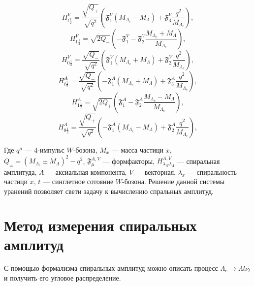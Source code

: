 \documentclass[a0,portrait]{a0poster}
\newcommand{\inrad}[1]{\left( #1 \right)}
\newcommand{\inner}[1]{\left( #1 \right)}
\newcommand\tab[1][0.51cm]{\hspace*{#1}}
\begin{document}
\begin{mdframed}[style=MyFrame]
\begin{multicols}{2}
\begin{multicols}{2}
    \begin{equation*}
    H^{V}_{t\frac{1}{2}} = \frac{\sqrt{Q_+}}{\sqrt{q^2}} \inrad{ \mathfrak F_1^V \inrad{ M_{\Lambda_c} - M_{\Lambda} } + \mathfrak F_3^V \frac{q^2}{M_{\Lambda_c}} },
    \end{equation*}
    \begin{equation*}
    H^{V}_{1\frac{1}{2}} = \sqrt{2Q_-} \inrad{ - \mathfrak F_1^V - \mathfrak F_2^V \frac{M_{\Lambda_c} + M_{\Lambda}}{M_{\Lambda_c}} },
    \end{equation*}
    \begin{equation*}
    H^{V}_{0\frac{1}{2}} = \frac{\sqrt{Q_-}}{\sqrt{q^2}} \inrad{ \mathfrak F_1^V \inrad{ M_{\Lambda_c} + M_{\Lambda} } + \mathfrak F_2^V \frac{q^2}{M_{\Lambda_c}} },
    \end{equation*}
    \begin{equation*}
    H^{A}_{t\frac{1}{2}} = \frac{\sqrt{Q_-}}{\sqrt{q^2}} \inrad{ - \mathfrak F_1^A \inrad{ M_{\Lambda_c} + M_{\Lambda} } + \mathfrak F_3^A \frac{q^2}{M_{\Lambda_c}} },
    \end{equation*}
    \begin{equation*}
    H^{A}_{1\frac{1}{2}} = \sqrt{2Q_+} \inrad{ \mathfrak F_1^A - \mathfrak F_2^A \frac{M_{\Lambda_c} - M_{\Lambda}}{M_{\Lambda_c}} },
    \end{equation*}
    \begin{equation*}
    H^{A}_{0\frac{1}{2}} = \frac{\sqrt{Q_+}}{\sqrt{q^2}} \inrad{ - \mathfrak F_1^A \inrad{ M_{\Lambda_c} - M_{\Lambda} } + \mathfrak F_2^A \frac{q^2}{M_{\Lambda_c}} },
    \end{equation*}
\end{multicols}

Где $q^\mu$ --- 4-импульс $W$-бозона, $M_x$ --- масса частици $x$, $Q_\pm = \inner{M_{\Lambda_c} \pm M_{\Lambda}}^2 - q^2$, 
$\mathfrak F_\mu^{A, V}$ --- формфакторы, $H_{\lambda_W \lambda_\Lambda}^{A, V}$ --- спиральная амплитуда, $A$ --- аксиальная компонента, $V$ --- векторная, $\lambda_x$ --- спиральность частици $x$, $t$ --- синглетное сотояние $W$-бозона. 
Решение данной системы уранений позволяет свети задачу к вычислению спральных амплитуд.


\section{Метод измерения спиральных амплитуд}

\tab С помощью формализма спиральных амплитуд можно описать процесс 
$\Lambda_c \to \Lambda l \nu_l$ и получить его угловое распределение.  


\end{multicols}
\end{mdframed}
\end{document}
